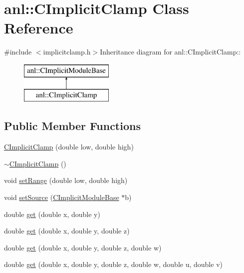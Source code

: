 \hypertarget{classanl_1_1CImplicitClamp}{
\section{anl::CImplicitClamp Class Reference}
\label{classanl_1_1CImplicitClamp}
}


{\ttfamily \#include $<$implicitclamp.h$>$}Inheritance diagram for anl::CImplicitClamp::\begin{figure}[H]
\begin{center}
\leavevmode
\includegraphics[height=2cm]{classanl_1_1CImplicitClamp}
\end{center}
\end{figure}
\subsection*{Public Member Functions}
\begin{DoxyCompactItemize}
\item 
\hyperlink{classanl_1_1CImplicitClamp_a83b99652f3faeea45d780e3364dae813}{CImplicitClamp} (double low, double high)
\item 
\hyperlink{classanl_1_1CImplicitClamp_ac10aba65ac1866aacb3270999f32ca75}{$\sim$CImplicitClamp} ()
\item 
void \hyperlink{classanl_1_1CImplicitClamp_ae009300b76acdea751bdf1f509824c58}{setRange} (double low, double high)
\item 
void \hyperlink{classanl_1_1CImplicitClamp_a9b2d8baf28a8d66910178a0f9db54ee5}{setSource} (\hyperlink{classanl_1_1CImplicitModuleBase}{CImplicitModuleBase} $\ast$b)
\item 
double \hyperlink{classanl_1_1CImplicitClamp_a2729b466be78da8a56b90eee7c3a2436}{get} (double x, double y)
\item 
double \hyperlink{classanl_1_1CImplicitClamp_ac35e4acee06cf5ad4ab4db236bcf8672}{get} (double x, double y, double z)
\item 
double \hyperlink{classanl_1_1CImplicitClamp_a2ccd309fe3a92eb4e5aaa9f5921b6be3}{get} (double x, double y, double z, double w)
\item 
double \hyperlink{classanl_1_1CImplicitClamp_aaa9e4cef1586ec11c49dff2c6563aeea}{get} (double x, double y, double z, double w, double u, double v)
\end{DoxyCompactItemize}
